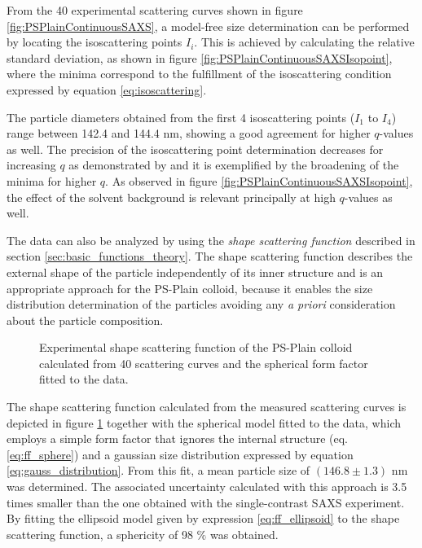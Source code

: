 From the 40 experimental scattering curves shown in figure \ref{fig:PSPlainContinuousSAXS}, a model-free size determination can be performed by locating the isoscattering points $I_i$. This is achieved by calculating the relative standard deviation, as shown in figure \ref{fig:PSPlainContinuousSAXSIsopoint}, where the minima correspond to the fulfillment of the isoscattering condition expressed by equation \ref{eq:isoscattering}.

The particle diameters obtained from the first 4 isoscattering points ($I_1$ to $I_4$) range between 142.4 and 144.4 nm, showing a good agreement for higher $q$-values as well. The precision of the isoscattering point determination decreases for increasing $q$ as demonstrated by \cite{kawaguchi_isoscattering_1992} and it is exemplified by the broadening of the minima for higher $q$. As observed in figure \ref{fig:PSPlainContinuousSAXSIsopoint}, the effect of the solvent background is relevant principally at high $q$-values as well.

The data can also be analyzed by using the \emph{shape scattering function} described in section \ref{sec:basic_functions_theory}. The shape scattering function describes the external shape of the particle independently of its inner structure and is an appropriate approach for the PS-Plain colloid, because it enables the size distribution determination of the particles avoiding any \emph{a priori} consideration about the particle composition.

\begin{figure}
	\begin{center}
		
	\end{center}
	\caption[Experimental shape scattering function of the PS-Plain colloid.]{Experimental shape scattering function of the PS-Plain colloid calculated from 40 scattering curves and the spherical form factor fitted to the data.}
	\label{fig:PSPlainResonantTerm}
\end{figure}

The shape scattering function calculated from the measured scattering curves is depicted in figure \ref{fig:PSPlainResonantTerm} together with the spherical model fitted to the data, which employs a simple form factor that ignores the internal structure (eq. \ref{eq:ff_sphere}) and a gaussian size distribution expressed by equation \ref{eq:gauss_distribution}. From this fit, a mean particle size of $(146.8\pm1.3)$ nm was determined. The associated uncertainty calculated with this approach is 3.5 times smaller than the one obtained with the single-contrast SAXS experiment. By fitting the ellipsoid model given by expression \ref{eq:ff_ellipsoid} to the shape scattering function, a sphericity of 98 $\%$ was obtained.

